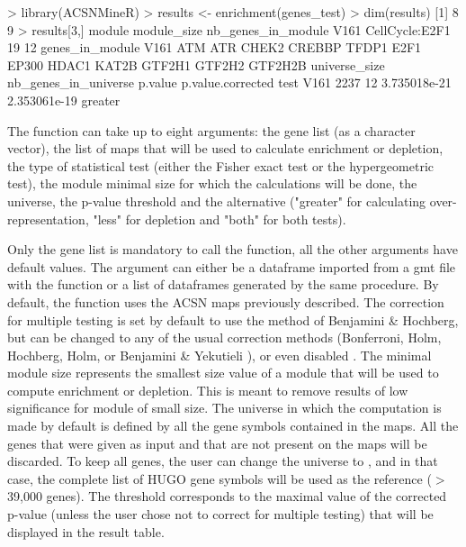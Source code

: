 \begin{example}
> library(ACSNMineR)
> results <- enrichment(genes_test)
> dim(results)
[1] 8  9
> results[3,]
            module module_size nb_genes_in_module
V161 CellCycle:E2F1          19                 12
                                                             genes_in_module
V161 ATM ATR CHEK2 CREBBP TFDP1 E2F1 EP300 HDAC1 KAT2B GTF2H1 GTF2H2 GTF2H2B
     universe_size nb_genes_in_universe      p.value p.value.corrected    test
V161          2237                   12 3.735018e-21      2.353061e-19 greater
\end{example}



The  function can take up to eight arguments: the gene list (as
a character vector), the list of maps that will be used to calculate enrichment
or depletion, the type of statistical test (either the Fisher exact test or the
hypergeometric test), the module minimal size for which the calculations will be
done, the universe, the p-value threshold and the alternative ("greater" for
calculating over-representation, "less" for depletion and "both" for both
tests).

Only the gene list is mandatory to call the  function, all the
other arguments have default values.  The  argument can either be a
dataframe imported from a gmt file with the  function or
a list of dataframes generated by the same procedure. By default, the function
uses the ACSN maps previously described.  The correction for multiple testing
is set by default to use the method of Benjamini \& Hochberg, but can be
changed to any of the usual correction methods (Bonferroni, Holm, Hochberg,
Holm, or Benjamini \& Yekutieli \citep{Benjamini2003FDR}), or even disabled .
The minimal module size represents the smallest size value of a module that
will be used to compute enrichment or depletion. This is meant to remove
results of low significance for module of small size.  The universe in which
the computation is made by default is defined by all the gene symbols contained
in the maps. All the genes that were given as input and that are not present on
the maps will be discarded. To keep all genes, the user can change the universe
to , and in that case, the complete list of HUGO gene symbols will
be used as the reference ($>$ 39,000 genes). The threshold corresponds to the
maximal value of the corrected p-value (unless the user chose not to correct
for multiple testing) that will be displayed in the result table.



